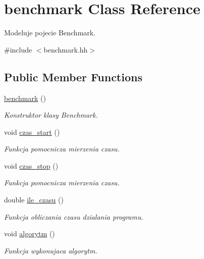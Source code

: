 \hypertarget{classbenchmark}{\section{benchmark Class Reference}
\label{classbenchmark}
}


Modeluje pojecie Benchmark.  




{\ttfamily \#include $<$benchmark.\-hh$>$}

\subsection*{Public Member Functions}
\begin{DoxyCompactItemize}
\item 
\hyperlink{classbenchmark_af56f1d9420c5c1ccc65e4f6aac54658d}{benchmark} ()
\begin{DoxyCompactList}\small\item\em Konstruktor klasy Benchmark. \end{DoxyCompactList}\item 
void \hyperlink{classbenchmark_a42ab532c49030406366e859f9b3f29f8}{czas\-\_\-start} ()
\begin{DoxyCompactList}\small\item\em Funkcja pomocnicza mierzenia czasu. \end{DoxyCompactList}\item 
void \hyperlink{classbenchmark_a9beb25d3e65b94c1ac7c085d8105fe65}{czas\-\_\-stop} ()
\begin{DoxyCompactList}\small\item\em Funkcja pomocnicza mierzenia czasu. \end{DoxyCompactList}\item 
double \hyperlink{classbenchmark_a613a8792feca7c2622355922d64d6fcd}{ile\-\_\-czasu} ()
\begin{DoxyCompactList}\small\item\em Funkcja obliczania czasu dzialania programu. \end{DoxyCompactList}\item 
void \hyperlink{classbenchmark_aedc5a477317912eb0d9ca5f9f1da3b7c}{algorytm} ()
\begin{DoxyCompactList}\small\item\em Funkcja wykonujaca algorytm. \end{DoxyCompactList}\end{DoxyCompactItemize}
